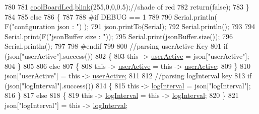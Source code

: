 \begin{DoxyCode}
780     
781             \hyperlink{class_cool_board_a1b1d3c684a5baa56b08486e192fd8e97}{coolBoardLed}.\hyperlink{class_cool_board_led_a96e1ea13003eee34c9dbcef340404426}{blink}(255,0,0,0.5);\textcolor{comment}{//shade of red     }
782             \textcolor{keywordflow}{return}(\textcolor{keyword}{false});
783         \}
784 
785         \textcolor{keywordflow}{else}
786         \{   
787         
788 \textcolor{preprocessor}{        #if DEBUG == 1}
789             
790             Serial.println( F(\textcolor{stringliteral}{"configuration json : "}) );
791             json.printTo(Serial);
792             Serial.println();
793             
794             Serial.print(F(\textcolor{stringliteral}{"jsonBuffer size : "}));
795             Serial.print(jsonBuffer.size());
796             Serial.println();
797 
798 \textcolor{preprocessor}{        #endif}
799             
800             \textcolor{comment}{//parsing userActive Key}
801             \textcolor{keywordflow}{if} (json[\textcolor{stringliteral}{"userActive"}].success())
802             \{
803                 \textcolor{keyword}{this} -> \hyperlink{class_cool_board_a6395459131d6889a3005f79c7a35e964}{userActive} = json[\textcolor{stringliteral}{"userActive"}];
804             \}
805 
806             \textcolor{keywordflow}{else}
807             \{
808                 \textcolor{keyword}{this} -> \hyperlink{class_cool_board_a6395459131d6889a3005f79c7a35e964}{userActive} = \textcolor{keyword}{this} -> \hyperlink{class_cool_board_a6395459131d6889a3005f79c7a35e964}{userActive};
809             \}
810             json[\textcolor{stringliteral}{"userActive"}] = \textcolor{keyword}{this} -> \hyperlink{class_cool_board_a6395459131d6889a3005f79c7a35e964}{userActive};
811 
812             \textcolor{comment}{//parsing logInterval key}
813             \textcolor{keywordflow}{if} (json[\textcolor{stringliteral}{"logInterval"}].success())
814             \{
815                 \textcolor{keyword}{this} -> \hyperlink{class_cool_board_a84bc94413b64973e4aba8c467c97006c}{logInterval} = json[\textcolor{stringliteral}{"logInterval"}];
816             \}
817             \textcolor{keywordflow}{else}
818             \{
819                 \textcolor{keyword}{this} -> \hyperlink{class_cool_board_a84bc94413b64973e4aba8c467c97006c}{logInterval} = \textcolor{keyword}{this} -> \hyperlink{class_cool_board_a84bc94413b64973e4aba8c467c97006c}{logInterval};
820             \}
821             json[\textcolor{stringliteral}{"logInterval"}] = \textcolor{keyword}{this} -> \hyperlink{class_cool_board_a84bc94413b64973e4aba8c467c97006c}{logInterval};

\end{DoxyCode}
